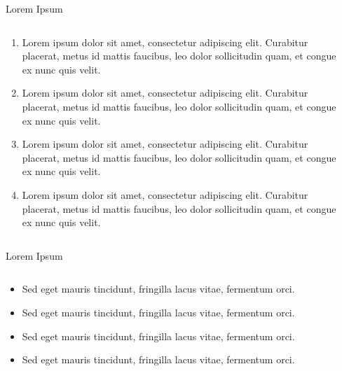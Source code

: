 \documentclass[UKenglish, aspectratio = 169]{beamer}
\begin{document}
\begin{frame}{Lorem Ipsum}
	\begin{columns}
		\begin{column}[T]{0.8\textwidth}
			\vspace*{4ex}
			\begin{enumerate}
				\item Lorem ipsum dolor sit amet, consectetur adipiscing elit. Curabitur placerat, metus id mattis faucibus, leo dolor sollicitudin quam, et congue ex nunc quis velit.
				\item Lorem ipsum dolor sit amet, consectetur adipiscing elit. Curabitur placerat, metus id mattis faucibus, leo dolor sollicitudin quam, et congue ex nunc quis velit.
				\item Lorem ipsum dolor sit amet, consectetur adipiscing elit. Curabitur placerat, metus id mattis faucibus, leo dolor sollicitudin quam, et congue ex nunc quis velit.
				\item Lorem ipsum dolor sit amet, consectetur adipiscing elit. Curabitur placerat, metus id mattis faucibus, leo dolor sollicitudin quam, et congue ex nunc quis velit.
			\end{enumerate}
		\end{column}
		\begin{column}{0.2\textwidth}
		\end{column}
	\end{columns}
\end{frame}

\begin{frame}{Lorem Ipsum}
	\begin{columns}
		\begin{column}[T]{0.8\textwidth}
			\vspace*{4ex}
			\begin{itemize}
				\item Sed eget mauris tincidunt, fringilla lacus vitae, fermentum orci.
				\item Sed eget mauris tincidunt, fringilla lacus vitae, fermentum orci.
				\item Sed eget mauris tincidunt, fringilla lacus vitae, fermentum orci.
				\item Sed eget mauris tincidunt, fringilla lacus vitae, fermentum orci.
			\end{itemize}
		\end{column}
		\begin{column}{0.2\textwidth}
		\end{column}
	\end{columns}
\end{frame}
\end{document}
